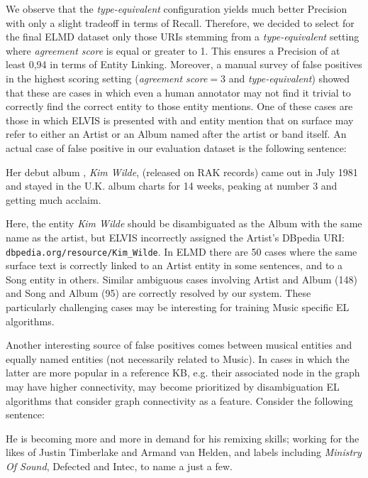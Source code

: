 We observe that the \textit{type-equivalent} configuration yields much better Precision with only a slight tradeoff in terms of Recall. Therefore, we decided to select for the final \textsc{ELMD} dataset only those URIs stemming from a \textit{type-equivalent} setting where \textit{agreement score} is equal or greater to 1. This ensures a Precision of at least 0,94 in terms of Entity Linking. Moreover, a manual survey of false positives in the highest scoring setting (\textit{agreement score}$=3$ and \textit{type-equivalent}) showed that these are cases in which even a human annotator may not find it trivial to correctly find the correct entity to those entity mentions. One of these cases are those in which \textsc{ELVIS} is presented with and entity mention that on surface may refer to either an Artist or an Album named after the artist or band itself. An actual case of false positive in our evaluation dataset is the following sentence:
\begin{adjustwidth}{2.5em}{20pt}
\begin{center}
Her debut album , \textit{Kim Wilde}, (released on RAK records) came out in July 1981 and stayed in the U.K. album charts for 14 weeks, peaking at number 3 and getting much acclaim.
\end{center}
\end{adjustwidth}

Here, the entity \textit{Kim Wilde} should be disambiguated as the Album with the same name as the artist, but \textsc{ELVIS} incorrectly assigned the Artist's DBpedia URI: {\footnotesize{\texttt{dbpedia.org/resource/Kim\_Wilde}}}. In \textsc{ELMD} there are 50 cases where the same surface text is correctly linked to an Artist entity in some sentences, and to a Song entity in others. Similar ambiguous cases involving Artist and Album (148) and Song and Album (95) are correctly resolved by our system. These particularly challenging cases may be interesting for training Music specific EL algorithms.

Another interesting source of false positives comes between musical entities and equally named entities (not necessarily related to Music). In cases in which the latter are more popular in a reference KB, e.g. their associated node in the graph may have higher connectivity, may become prioritized by disambiguation EL algorithms that consider graph connectivity as a feature. Consider the following sentence:

\begin{adjustwidth}{2.5em}{20pt}
\begin{center}
He is becoming more and more in demand for his remixing skills; working for the likes of Justin Timberlake and Armand van Helden, and labels including \textit{Ministry Of Sound}, Defected and Intec, to name a just a few.
\end{center}
\end{adjustwidth}

